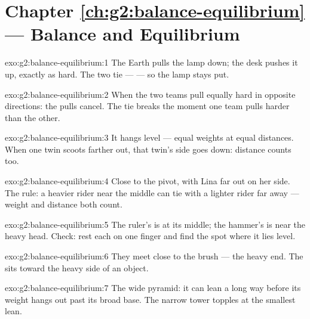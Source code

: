 \section*{Chapter \ref{ch:g2:balance-equilibrium} --- Balance and Equilibrium}

\begin{solution}{exo:g2:balance-equilibrium:1}
The Earth pulls the lamp down; the desk pushes it up, exactly as
hard. The two  tie ---  --- so the lamp stays put.
\end{solution}

\begin{solution}{exo:g2:balance-equilibrium:2}
When the two teams pull equally hard in opposite directions: the
pulls cancel. The tie breaks the moment one team pulls harder than
the other.
\end{solution}

\begin{solution}{exo:g2:balance-equilibrium:3}
It hangs level --- equal weights at equal distances. When one twin
scoots farther out, that twin's side goes down: distance counts too.
\end{solution}

\begin{solution}{exo:g2:balance-equilibrium:4}
Close to the pivot, with Lina far out on her side. The rule: a
heavier rider near the middle can tie with a lighter rider far away
--- weight and distance both count.
\end{solution}

\begin{solution}{exo:g2:balance-equilibrium:5}
The ruler's  is at its middle; the hammer's is near the
heavy head. Check: rest each on one finger and find the spot where
it lies level.
\end{solution}

\begin{solution}{exo:g2:balance-equilibrium:6}
They meet close to the brush --- the heavy end. The 
sits toward the heavy side of an object.
\end{solution}

\begin{solution}{exo:g2:balance-equilibrium:7}
The wide pyramid: it can lean a long way before its weight hangs out
past its broad base. The narrow tower topples at the smallest lean.
\end{solution}

